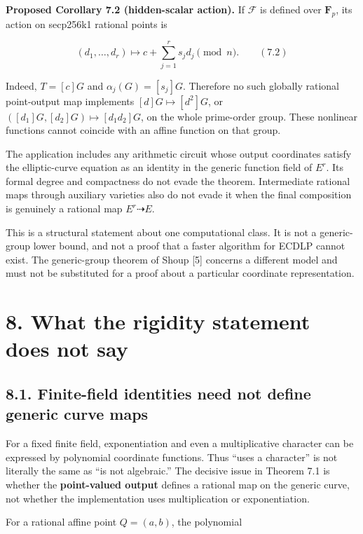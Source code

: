 \documentclass[
  11pt,
  a4paper,
]{article}
\begin{document}
\textbf{Proposed Corollary 7.2 (hidden-scalar action).} If
\(\mathcal F\) is defined over \(\mathbf F_p\), its action on secp256k1
rational points is

\[
(d_1,\ldots,d_r)\longmapsto c+\sum_{j=1}^rs_jd_j\pmod n. \qquad (7.2)
\]

Indeed, \(T=[c]G\) and \(\alpha_j(G)=[s_j]G\). Therefore no such
globally rational point-output map implements \([d]G\mapsto[d^2]G\), or
\(([d_1]G,[d_2]G)\mapsto[d_1d_2]G\), on the whole prime-order group.
These nonlinear functions cannot coincide with an affine function on
that group.

The application includes any arithmetic circuit whose output coordinates
satisfy the elliptic-curve equation as an identity in the generic
function field of \(E^r\). Its formal degree and compactness do not
evade the theorem. Intermediate rational maps through auxiliary
varieties also do not evade it when the final composition is genuinely a
rational map \(E^r\dashrightarrow E\).

This is a structural statement about one computational class. It is not
a generic-group lower bound, and not a proof that a faster algorithm for
ECDLP cannot exist. The generic-group theorem of Shoup {[}5{]} concerns
a different model and must not be substituted for a proof about a
particular coordinate representation.

\section{8. What the rigidity statement does not
say}\label{what-the-rigidity-statement-does-not-say}

\subsection{8.1. Finite-field identities need not define generic curve
maps}\label{finite-field-identities-need-not-define-generic-curve-maps}

For a fixed finite field, exponentiation and even a multiplicative
character can be expressed by polynomial coordinate functions. Thus
``uses a character'' is not literally the same as ``is not algebraic.''
The decisive issue in Theorem 7.1 is whether the \textbf{point-valued
output} defines a rational map on the generic curve, not whether the
implementation uses multiplication or exponentiation.

For a rational affine point \(Q=(a,b)\), the polynomial
\end{document}
